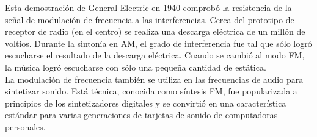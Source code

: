 \documentclass[a4paper]{article}
\begin{document}
Esta demostración de General Electric en 1940 comprobó la resistencia de la señal de modulación de frecuencia a las interferencias. Cerca del prototipo de receptor de radio (en el centro) se realiza una descarga eléctrica de un millón de voltios. Durante la sintonía en AM, el grado de interferencia fue tal que sólo logró escucharse el resultado de la descarga eléctrica. Cuando se cambió al modo FM, la música logró escucharse con sólo una pequeña cantidad de estática.
\\
La modulación de frecuencia también se utiliza en las frecuencias de audio para sintetizar sonido. Está técnica, conocida como síntesis FM, fue popularizada a principios de los sintetizadores digitales y se convirtió en una característica estándar para varias generaciones de tarjetas de sonido de computadoras personales. 
\\
\\
\noindent{}
\end{document}
